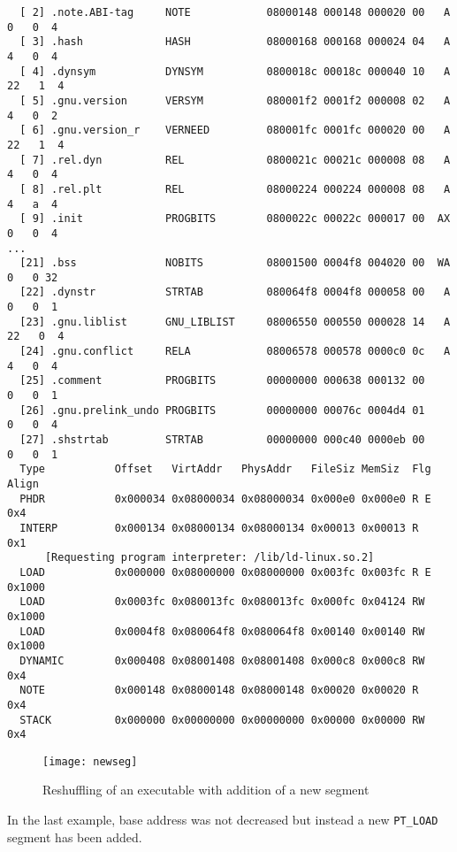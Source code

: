\documentclass[twoside]{article}
\def\tts#1{\texttt{\small #1}}
\begin{document}
{{\begin{verbatim}
  [ 2] .note.ABI-tag     NOTE            08000148 000148 000020 00   A  0   0  4
  [ 3] .hash             HASH            08000168 000168 000024 04   A  4   0  4
  [ 4] .dynsym           DYNSYM          0800018c 00018c 000040 10   A 22   1  4
  [ 5] .gnu.version      VERSYM          080001f2 0001f2 000008 02   A  4   0  2
  [ 6] .gnu.version_r    VERNEED         080001fc 0001fc 000020 00   A 22   1  4
  [ 7] .rel.dyn          REL             0800021c 00021c 000008 08   A  4   0  4
  [ 8] .rel.plt          REL             08000224 000224 000008 08   A  4   a  4
  [ 9] .init             PROGBITS        0800022c 00022c 000017 00  AX  0   0  4
...
  [21] .bss              NOBITS          08001500 0004f8 004020 00  WA  0   0 32
  [22] .dynstr           STRTAB          080064f8 0004f8 000058 00   A  0   0  1
  [23] .gnu.liblist      GNU_LIBLIST     08006550 000550 000028 14   A 22   0  4
  [24] .gnu.conflict     RELA            08006578 000578 0000c0 0c   A  4   0  4
  [25] .comment          PROGBITS        00000000 000638 000132 00      0   0  1
  [26] .gnu.prelink_undo PROGBITS        00000000 00076c 0004d4 01      0   0  4
  [27] .shstrtab         STRTAB          00000000 000c40 0000eb 00      0   0  1
  Type           Offset   VirtAddr   PhysAddr   FileSiz MemSiz  Flg Align
  PHDR           0x000034 0x08000034 0x08000034 0x000e0 0x000e0 R E 0x4
  INTERP         0x000134 0x08000134 0x08000134 0x00013 0x00013 R   0x1
      [Requesting program interpreter: /lib/ld-linux.so.2]
  LOAD           0x000000 0x08000000 0x08000000 0x003fc 0x003fc R E 0x1000
  LOAD           0x0003fc 0x080013fc 0x080013fc 0x000fc 0x04124 RW  0x1000
  LOAD           0x0004f8 0x080064f8 0x080064f8 0x00140 0x00140 RW  0x1000
  DYNAMIC        0x000408 0x08001408 0x08001408 0x000c8 0x000c8 RW  0x4
  NOTE           0x000148 0x08000148 0x08000148 0x00020 0x00020 R   0x4
  STACK          0x000000 0x00000000 0x00000000 0x00000 0x00000 RW  0x4
\end{verbatim}}
}

\begin{figure}[!ht]
\centering
\texttt{[image: newseg]}
\caption{Reshuffling of an executable with addition of a new segment}
\end{figure}

In the last example, base address was not decreased but instead a new
\tts{PT\_LOAD} segment has been added.
\end{document}
